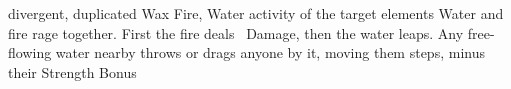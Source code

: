   {divergent, duplicated}%
  {Wax}%
  {Fire, Water}%
  {activity of the target elements}%
  {%
    Water and fire rage together.
    First the fire deals \showDam~Damage, then the water leaps.
    Any free-flowing water nearby throws or drags anyone by it, moving them  \glspl{step}, minus their Strength Bonus}%
  {}
